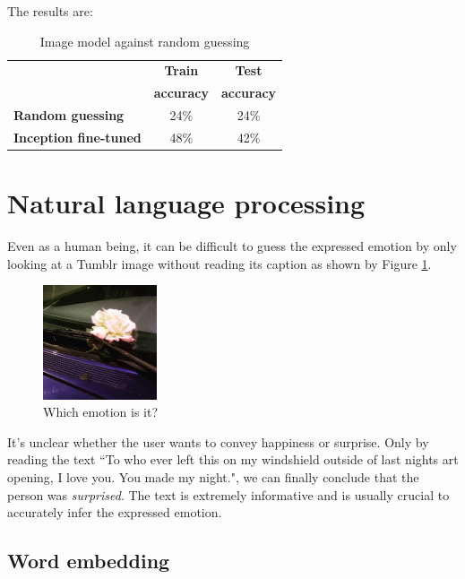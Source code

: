 \documentclass{article} %
\begin{document}
The results are:
\begin{table}[H]
\caption{Image model against random guessing}
\begin{center}
    \begin{tabular}{| l | c | c |}
    \hline
    & \textbf{Train} & \textbf{Test} \\
    & \textbf{accuracy} & \textbf{accuracy} \\ \hline
    \textbf{Random guessing} & 24\% & 24\% \\ \hline
    \textbf{Inception fine-tuned}  & 48\% & 42\% \\
    \hline
    \end{tabular}
\end{center} 
\end{table}

\section{Natural language processing}
Even as a human being, it can be difficult to guess the expressed emotion by only looking at a Tumblr image without reading its caption as shown by Figure \ref{surprised-unclear}.

\begin{figure}[H]
    \centering
    \includegraphics[width=0.3\textwidth]{Images/flower.jpg}
    \caption{Which emotion is it?}
    \label{surprised-unclear}
\end{figure}

It's unclear whether the user wants to convey happiness or surprise. Only by reading the text ``To who ever left this on my windshield outside of last nights art opening, I love you. You made my night.", we can finally conclude that the person was {\em surprised}. The text is extremely informative and is usually crucial to accurately infer the expressed emotion.

\subsection{Word embedding}
\end{document}
